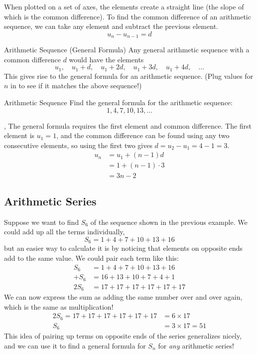 \documentclass[../../main.tex]{subfiles}
\begin{document}
When plotted on a set of axes, the elements create a straight line (the slope of which is the common difference). To find the common difference of an arithmetic sequence, we can take any element and subtract the previous element.
\[
    u_n - u_{n-1} = d
\]

\begin{theorem}{Arithmetic Sequence (General Formula)}
Any general arithmetic sequence with a common difference \(d\) would have the elements
\[
    u_1,\quad u_1+d,\quad u_1+2d,\quad u_1+3d,\quad u_1+4d,\quad \ldots
\]
This gives rise to the general formula for an arithmetic sequence. (Plug values for \(n\) in to see if it matches the above sequence!)
\end{theorem}

\begin{example}{Arithmetic Sequence}
Find the general formula for the arithmetic sequence:
\[
    1, 4, 7, 10, 13, \ldots
\]

\sep
The general formula requires the first element and common difference. The first element is \(u_1 = 1\), and the common difference can be found using any two consecutive elements, so using the first two gives \(d = u_2 - u_1 = 4 - 1 = 3\).
\begin{align}
    u_n &= u_1 + (n-1)d\\
    &= 1 + (n-1)\cdot3\\
    &= 3n - 2
\end{align}
\end{example}

\subsection{Arithmetic Series}

Suppose we want to find \(S_6\) of the sequence shown in the previous example. We could add up all the terms individually,
\[
    S_6=1+4+7+10+13+16
\]
but an easier way to calculate it is by noticing that elements on opposite ends add to the same value. We could pair each term like this:
\begin{align}
    S_6&=1+4+7+10+13+16\\
    +S_6&=16+13+10+7+4+1\\
    2S_6&=17+17+17+17+17+17
\end{align}
We can now express the sum as adding the same number over and over again, which is the same as multiplication!
\begin{align}
    2S_6 = 17+17+17+17+17+17 &= 6\times17\\
    S_6 &= 3\times17 = 51
\end{align}
This idea of pairing up terms on opposite ends of the series generalizes nicely, and we can use it to find a general formula for \(S_n\) for \emph{any} arithmetic series!
\end{document}
